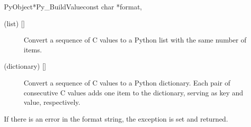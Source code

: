 \begin{cfuncdesc}{PyObject*}{Py_BuildValue}{const char *format,
                                            \moreargs}
\begin{description}
    \item[ (list) {[]}]
    Convert a sequence of C values to a Python list with the same
    number of items.

    \item[ (dictionary) {[]}]
    Convert a sequence of C values to a Python dictionary.  Each pair
    of consecutive C values adds one item to the dictionary, serving
    as key and value, respectively.

  \end{description}

  If there is an error in the format string, the
   exception is set and \NULL{} returned.
\end{cfuncdesc}
